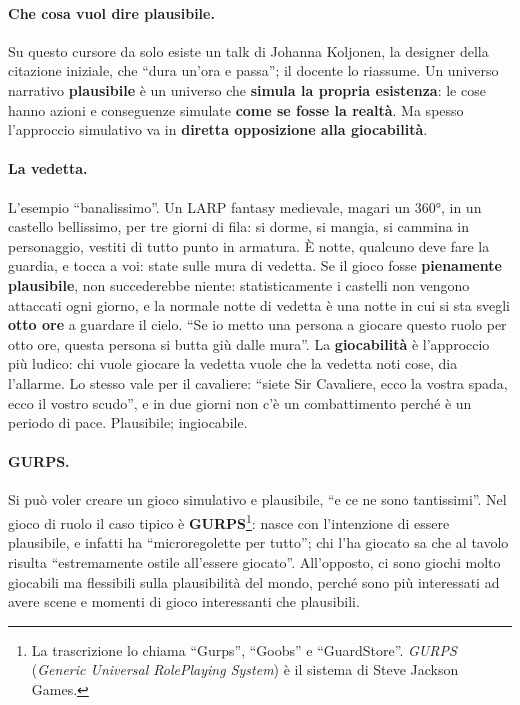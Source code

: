 \paragraph{Che cosa vuol dire plausibile.} Su questo cursore da solo esiste un
talk di Johanna Koljonen, la designer della citazione iniziale, che ``dura un'ora
e passa''; il docente lo riassume. Un universo narrativo \textbf{plausibile} è un
universo che \textbf{simula la propria esistenza}: le cose hanno azioni e
conseguenze simulate \textbf{come se fosse la realtà}. Ma spesso l'approccio
simulativo va in \textbf{diretta opposizione alla giocabilità}.

\paragraph{La vedetta.} L'esempio ``banalissimo''. Un LARP fantasy medievale,
magari un 360°, in un castello bellissimo, per tre giorni di fila: si dorme, si
mangia, si cammina in personaggio, vestiti di tutto punto in armatura. È notte,
qualcuno deve fare la guardia, e tocca a voi: state sulle mura di vedetta. Se il
gioco fosse \textbf{pienamente plausibile}, non succederebbe niente:
statisticamente i castelli non vengono attaccati ogni giorno, e la normale notte
di vedetta è una notte in cui si sta svegli \textbf{otto ore} a guardare il cielo.
``Se io metto una persona a giocare questo ruolo per otto ore, questa persona si
butta giù dalle mura''. La \textbf{giocabilità} è l'approccio più ludico: chi
vuole giocare la vedetta vuole che la vedetta noti cose, dia l'allarme. Lo stesso
vale per il cavaliere: ``siete Sir Cavaliere, ecco la vostra spada, ecco il
vostro scudo'', e in due giorni non c'è un combattimento perché è un periodo di
pace. Plausibile; ingiocabile.

\paragraph{GURPS.} Si può voler creare un gioco simulativo e plausibile, ``e ce
ne sono tantissimi''. Nel gioco di ruolo il caso tipico è
\textbf{GURPS}\footnote{La trascrizione lo chiama ``Gurps'', ``Goobs'' e
``GuardStore''. \emph{GURPS} (\emph{Generic Universal RolePlaying System}) è
il sistema di Steve Jackson Games.}: nasce con l'intenzione di essere plausibile,
e infatti ha ``microregolette per tutto''; chi l'ha giocato sa che al tavolo
risulta ``estremamente ostile all'essere giocato''. All'opposto, ci sono giochi
molto giocabili ma flessibili sulla plausibilità del mondo, perché sono più
interessati ad avere scene e momenti di gioco interessanti che plausibili.

